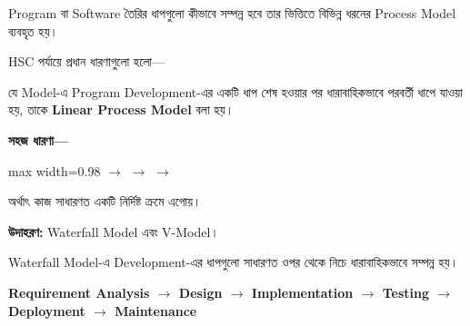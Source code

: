 
Program বা Software তৈরির ধাপগুলো কীভাবে সম্পন্ন হবে তার ভিত্তিতে
বিভিন্ন ধরনের Process Model ব্যবহৃত হয়।

HSC পর্যায়ে প্রধান ধারণাগুলো হলো—


\begin{definitionbox}

যে Model-এ Program Development-এর একটি ধাপ শেষ হওয়ার পর
ধারাবাহিকভাবে পরবর্তী ধাপে যাওয়া হয়, তাকে
\textbf{Linear Process Model} বলা হয়।

\end{definitionbox}

\textbf{সহজ ধারণা—}

\begin{center}
\begin{adjustbox}{max width=0.98\linewidth}
\(\longrightarrow\)
\(\longrightarrow\)
\(\longrightarrow\)
\end{adjustbox}
\end{center}

অর্থাৎ কাজ সাধারণত একটি নির্দিষ্ট ক্রমে এগোয়।

\textbf{উদাহরণ:}
Waterfall Model এবং V-Model।


Waterfall Model-এ Development-এর ধাপগুলো সাধারণত ওপর থেকে নিচে
ধারাবাহিকভাবে সম্পন্ন হয়।

\begin{center}

\textbf{
Requirement Analysis
\(\rightarrow\)
Design
\(\rightarrow\)
Implementation
\(\rightarrow\)
Testing
\(\rightarrow\)
Deployment
\(\rightarrow\)
Maintenance
}

\end{center}


